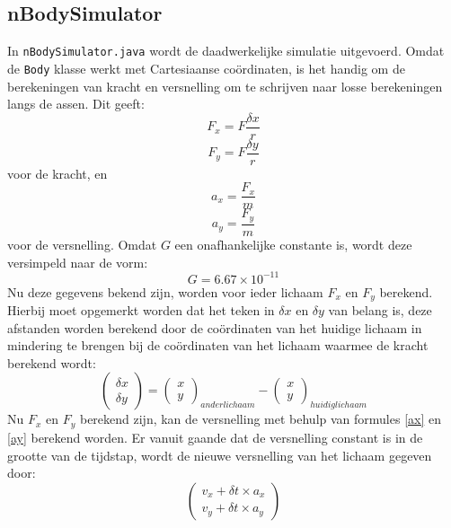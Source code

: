 \documentclass[12pt]{article}
\begin{document}
\subsection{nBodySimulator}
In \verb|nBodySimulator.java| wordt de daadwerkelijke simulatie uitgevoerd. Omdat de \verb|Body| klasse werkt met Cartesiaanse co\"ordinaten, is het handig om de berekeningen van kracht en versnelling om te schrijven naar losse berekeningen langs de assen. Dit geeft:
\begin{equation}
	F_x = F\frac{{\delta}x}{r}
\end{equation}
\begin{equation}
	F_y = F\frac{{\delta}y}{r}
\end{equation}
voor de kracht, en
\begin{equation}
	a_x = \frac{F_x}{m}
	\label{ax}
\end{equation}
\begin{equation}
	a_y = \frac{F_y}{m}
	\label{ay}
\end{equation}
voor de versnelling. Omdat $G$ een onafhankelijke constante is, wordt deze versimpeld naar de vorm:
\begin{equation}
	G = 6.67 \times 10^{-11}
\end{equation}
Nu deze gegevens bekend zijn, worden voor ieder lichaam $F_x$ en $F_y$ berekend. Hierbij moet opgemerkt worden dat het teken in ${\delta}x$ en ${\delta}y$ van belang is, deze afstanden worden berekend door de co\"ordinaten van het huidige lichaam in mindering te brengen bij de co\"ordinaten van het lichaam waarmee de kracht berekend wordt:
\begin{equation}
	\begin{pmatrix} {\delta}x \\
	{\delta}y
	\end{pmatrix}
	= 
	\begin{pmatrix} x \\
	y
	\end{pmatrix}_{ander lichaam}
	- 
	\begin{pmatrix} x \\
	y
	\end{pmatrix}_{huidig lichaam}
\end{equation}
Nu $F_x$ en $F_y$ berekend zijn, kan de versnelling met behulp van formules \ref{ax} en \ref{ay} berekend worden. Er vanuit gaande dat de versnelling constant is in de grootte van de tijdstap, wordt de nieuwe versnelling van het lichaam gegeven door:
\begin{equation}
	\begin{pmatrix}v_x + {\delta}t \times a_x \\
	v_y + {\delta}t \times a_y
	\end{pmatrix}
\end{equation}
\end{document}
